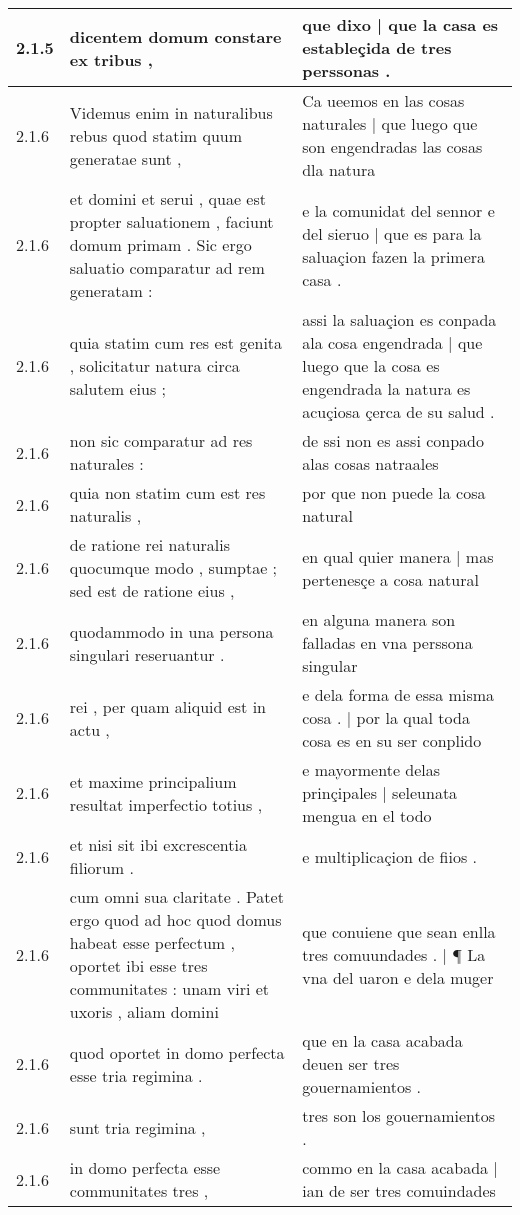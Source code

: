 \begin{tabular}{|p{1cm}|p{6.5cm}|p{6.5cm}|}
2.1.5 & dicentem domum constare ex tribus , & que dixo | que la casa es estableçida de tres perssonas . \\\hline
2.1.6 & Videmus enim in naturalibus rebus quod statim quum generatae sunt , & Ca ueemos en las cosas naturales | que luego que son engendradas las cosas dla natura \\\hline
2.1.6 & et domini et serui , quae est propter saluationem , faciunt domum primam . Sic ergo saluatio comparatur ad rem generatam : & e la comunidat del sennor e del sieruo | que es para la saluaçion fazen la primera casa . \\\hline
2.1.6 & quia statim cum res est genita , solicitatur natura circa salutem eius ; & assi la saluaçion es conpada ala cosa engendrada | que luego que la cosa es engendrada la natura es acuçiosa çerca de su salud . \\\hline
2.1.6 & non sic comparatur ad res naturales : & de ssi non es assi conpado alas cosas natraales \\\hline
2.1.6 & quia non statim cum est res naturalis , & por que non puede la cosa natural \\\hline
2.1.6 & de ratione rei naturalis quocumque modo , sumptae ; sed est de ratione eius , & en qual quier manera | mas pertenesçe a cosa natural \\\hline
2.1.6 & quodammodo in una persona singulari reseruantur . & en alguna manera son falladas en vna perssona singular \\\hline
2.1.6 & rei , per quam aliquid est in actu , & e dela forma de essa misma cosa . | por la qual toda cosa es en su ser conplido \\\hline
2.1.6 & et maxime principalium resultat imperfectio totius , & e mayormente delas prinçipales | seleunata mengua en el todo \\\hline
2.1.6 & et nisi sit ibi excrescentia filiorum . & e multiplicaçion de fiios . \\\hline
2.1.6 & cum omni sua claritate . Patet ergo quod ad hoc quod domus habeat esse perfectum , oportet ibi esse tres communitates : unam viri et uxoris , aliam domini & que conuiene que sean enlla tres comuundades . | ¶ La vna del uaron e dela muger \\\hline
2.1.6 & quod oportet in domo perfecta esse tria regimina . & que en la casa acabada deuen ser tres gouernamientos . \\\hline
2.1.6 & sunt tria regimina , & tres son los gouernamientos . \\\hline
2.1.6 & in domo perfecta esse communitates tres , & commo en la casa acabada | ian de ser tres comuindades \\\hline

\end{tabular}
